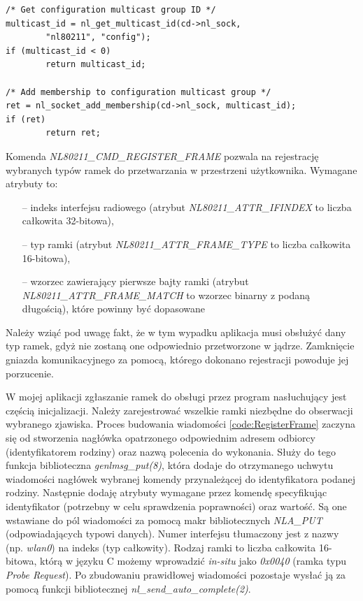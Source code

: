 \begin{lstlisting}[frame=tb]
/* Get configuration multicast group ID */
multicast_id = nl_get_multicast_id(cd->nl_sock, 
        "nl80211", "config");
if (multicast_id < 0)
        return multicast_id;
                                        
/* Add membership to configuration multicast group */
ret = nl_socket_add_membership(cd->nl_sock, multicast_id);
if (ret)
        return ret;
\end{lstlisting}

Komenda \emph{NL80211\_CMD\_REGISTER\_FRAME} pozwala na rejestrację wybranych typów ramek do przetwarzania w przestrzeni użytkownika. Wymagane atrybuty to:
\begin{itemize}
\item[--] indeks interfejsu radiowego (atrybut \emph{NL80211\_ATTR\_IFINDEX} to liczba całkowita 32-bitowa), 
\item[--] typ ramki (atrybut \emph{NL80211\_ATTR\_FRAME\_TYPE} to liczba całkowita 16-bitowa),
\item[--] wzorzec zawierający pierwsze bajty ramki (atrybut \emph{NL80211\_ATTR\_FRAME\_MATCH} to wzorzec binarny z podaną długością), które powinny być dopasowane
\end{itemize}

Należy wziąć pod uwagę fakt, że w tym wypadku aplikacja musi obsłużyć dany typ ramek, gdyż nie zostaną one odpowiednio przetworzone w jądrze. Zamknięcie gniazda komunikacyjnego za pomocą, którego dokonano rejestracji powoduje jej porzucenie. 

W mojej aplikacji zgłaszanie ramek do obsługi przez program nasłuchujący jest częścią inicjalizacji. Należy zarejestrować wszelkie ramki niezbędne do obserwacji wybranego zjawiska. Proces budowania wiadomości \ref{code:RegisterFrame} zaczyna się od stworzenia nagłówka opatrzonego odpowiednim adresem odbiorcy (identyfikatorem rodziny) oraz nazwą polecenia do wykonania. Służy do tego funkcja biblioteczna \emph{genlmsg\_put(8)}, która dodaje do otrzymanego uchwytu wiadomości nagłówek wybranej komendy przynależącej do identyfikatora podanej rodziny. Następnie dodaję atrybuty wymagane przez komendę specyfikując identyfikator (potrzebny w celu sprawdzenia poprawności) oraz wartość. Są one wstawiane do pól wiadomości za pomocą makr bibliotecznych \emph{NLA\_PUT} (odpowiadających typowi danych). Numer interfejsu tłumaczony jest z nazwy (np. \emph{wlan0}) na indeks (typ całkowity). Rodzaj ramki to liczba całkowita 16-bitowa, którą w języku C możemy wprowadzić \emph{in-situ} jako \emph{0x0040} (ramka typu \emph{Probe Request}). Po zbudowaniu prawidłowej wiadomości pozostaje wysłać ją za pomocą funkcji bibliotecznej \emph{nl\_send\_auto\_complete(2)}. 

